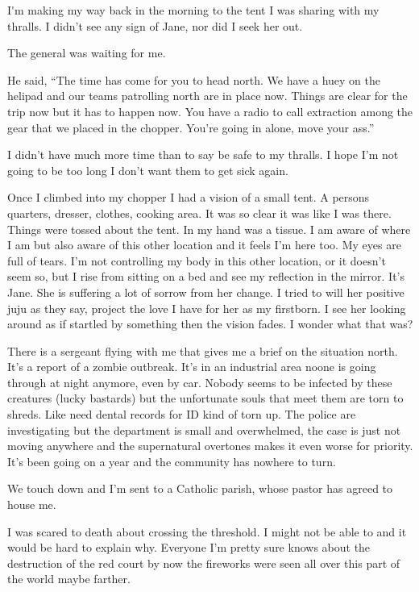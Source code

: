 \lettrine[lines=2,lraise=0]{I}'m making my way back in the morning to the tent I was sharing with my thralls. I didn't see any sign of Jane, nor did I seek her out. 



The general was waiting for me.

He said, ``The time has come for you to head north. We have a huey on the helipad and our teams patrolling north are in place now. Things are clear for the trip now but it has to happen now. You have a radio to call extraction among the gear that we placed in the chopper. You're going in alone, move your ass.''

I didn't have much more time than to say be safe to my thralls. I hope I'm not going to be too long I don't want them to get sick again.

Once I climbed into my chopper I had a vision of a small tent. A persons quarters, dresser, clothes, cooking area. It was so clear it was like I was there. Things were tossed about the tent. In my hand was a tissue. I am aware of where I am but also aware of this other location and it feels I'm here too. My eyes are full of tears. I'm not controlling my body in this other location, or it doesn't seem so, but I rise from sitting on a bed and see my reflection in the mirror. It's Jane. She is suffering a lot of sorrow from her change. I tried to will her positive juju as they say, project the love I have for her as my firstborn. I see her looking around as if startled by something then the vision fades. I wonder what that was?

There is a sergeant flying with me that gives me a brief on the situation north. It's a report of a zombie outbreak. It's in an industrial area noone is going through at night anymore, even by car. Nobody seems to be infected by these creatures (lucky bastards) but the unfortunate souls that meet them are torn to shreds. Like need dental records for ID kind of torn up. The police are investigating but the department is small and overwhelmed, the case is just not moving anywhere and the supernatural overtones makes it even worse for priority. It's been going on a year and the community has nowhere to turn.

\parasep

We touch down and I'm sent to a Catholic parish, whose pastor has agreed to house me.

I was scared to death about crossing the threshold. I might not be able to and it would be hard to explain why. Everyone I'm pretty sure knows about the destruction of the red court by now the fireworks were seen all over this part of the world maybe farther.


